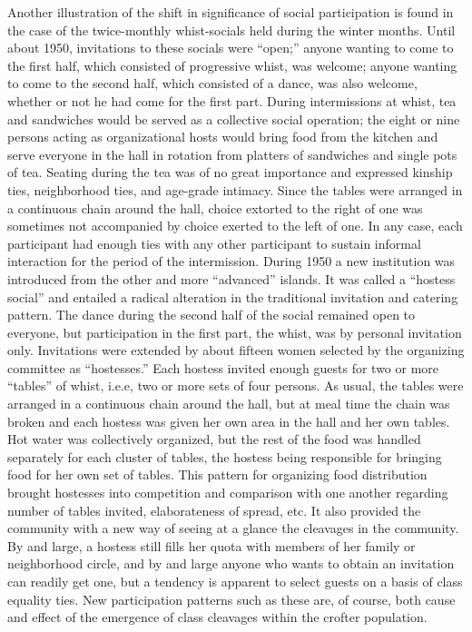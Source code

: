 \documentclass[openany,nobib]{tufte-book}
\begin{document}
Another illustration of the shift in significance of social
participation is found in the case of the twice-monthly whist-socials
held during the winter months. Until about 1950, invitations to these
socials were ``open;'' anyone wanting to come to the first half, which
consisted of progressive whist, was welcome; anyone wanting to come to
the second half, which consisted of a dance, was also welcome, whether
or not he had come for the first part. During intermissions at whist,
tea and sandwiches would be served as a collective social operation; the
eight or nine persons acting as organizational hosts would bring food
from the kitchen and serve everyone in the hall in rotation from
platters of sandwiches and single pots of tea. Seating during the tea
was of no great importance and expressed kinship ties, neighborhood
ties, and age-grade intimacy. Since the tables were arranged in a
continuous chain around the hall, choice extorted to the right of one
was sometimes not accompanied by choice exerted to the left of one. In
any case, each participant had enough ties with any other participant to
sustain informal interaction for the period of the intermission. During
1950 a new institution was introduced from the other and more
``advanced'' islands. It was called a ``hostess social'' and entailed a
radical alteration in the traditional invitation and catering pattern.
The dance during the second half of the social remained open to
everyone, but participation in the first part, the whist, was by
personal invitation only. Invitations were extended by about fifteen
women selected by the organizing committee as ``hostesses.'' Each
hostess invited enough guests for two or more ``tables'' of whist,
i.e.e, two or more sets of four persons. As usual, the tables were
arranged in a continuous chain around the hall, but at meal time the
chain was broken and each hostess was given her own area in the hall and
her own tables. Hot water was collectively organized, but the rest of
the food was handled separately for each cluster of tables, the hostess
being responsible for bringing food for her own set of tables. This
pattern for organizing food distribution brought hostesses into
competition and comparison with one another regarding number of tables
invited, elaborateness of spread, etc. It also provided the community
with a new way of seeing at a glance the cleavages in the community. By
and large, a hostess still fills her quota with members of her family or
neighborhood circle, and by and large anyone who wants to obtain an
invitation can readily get one, but a tendency is apparent to select
guests on a basis of class equality ties. New participation patterns
such as these are, of course, both cause and effect of the emergence of
class cleavages within the crofter population.
\end{document}
